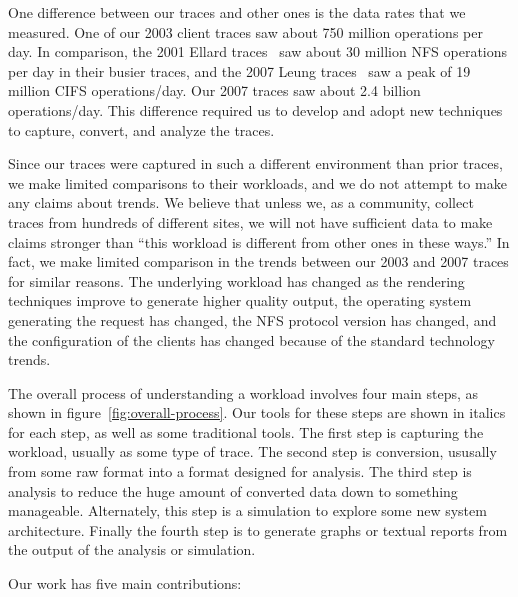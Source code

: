 One difference between our traces and other ones is the data rates
that we measured.  One of our 2003 client traces saw about 750 million
operations per day.  In comparison, the 2001 Ellard
traces~\cite{EllardFast03} saw about 30 million NFS operations per day
in their busier traces, and the 2007 Leung traces~\cite{LeungUsenix08}
saw a peak of 19 million CIFS operations/day.  Our 2007 traces saw
about 2.4 billion operations/day.  This difference required us to
develop and adopt new techniques to capture, convert, and analyze the
traces.

Since our traces were captured in such a different environment than
prior traces, we make limited comparisons to their workloads, and we
do not attempt to make any claims about trends.  We believe that
unless we, as a community, collect traces from hundreds of different
sites, we will not have sufficient data to make claims stronger than
``this workload is different from other ones in these ways.''  In
fact, we make limited comparison in the trends between our 2003 and
2007 traces for similar reasons.  The underlying workload has changed
as the rendering techniques improve to generate higher quality output,
the operating system generating the request has changed, the NFS
protocol version has changed, and the configuration of the clients has
changed because of the standard technology trends.

The overall process of understanding a workload involves four main
steps, as shown in figure~\ref{fig:overall-process}.  Our tools for
these steps are shown in italics for each step, as well as some
traditional tools.  The first step is capturing the workload, usually
as some type of trace.  The second step is conversion, ususally from
some raw format into a format designed for analysis.  The third step
is analysis to reduce the huge amount of converted data down to
something manageable.  Alternately, this step is a simulation to
explore some new system architecture.  Finally the fourth step is to
generate graphs or textual reports from the output of the analysis or
simulation.

Our work has five main contributions:

